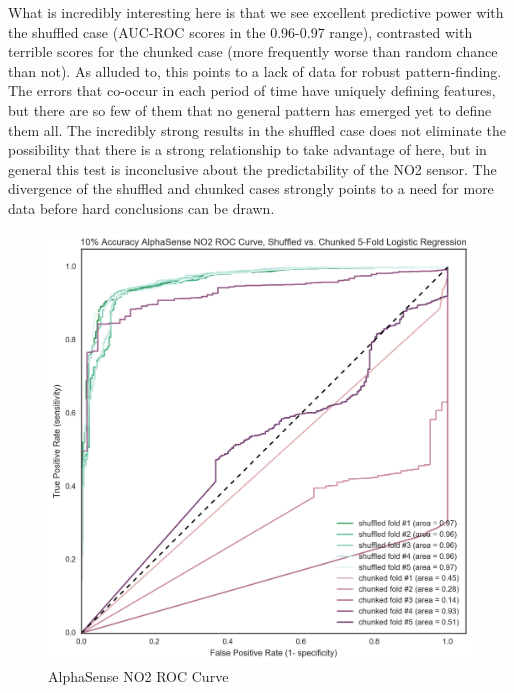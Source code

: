 \begin{margintable}
\centering
\offinterlineskip
\hspace*{-5cm}\raisebox{-4cm}[0pt][0pt]{}\par
\hspace{.3cm}\par
\vspace{-.5cm}
\hspace*{1cm}\par
{}
\vspace{-.35cm}\raisebox{-1cm}
}
\label{tab:as_no2_confusion}
\caption{Average AlphaSense NO2 Confusion Matrix w/Shuffled K-Fold}
\end{margintable}

What is incredibly interesting here is that we see excellent predictive power with the shuffled case (AUC-ROC scores in the 0.96-0.97 range), contrasted with terrible scores for the chunked case (more frequently worse than random chance than not).  As alluded to, this points to a lack of data for robust pattern-finding.  The errors that co-occur in each period of time have uniquely defining features, but there are so few of them that no general pattern has emerged yet to define them all.  The incredibly strong results in the shuffled case does not eliminate the possibility that there is a strong relationship to take advantage of here, but in general this test is inconclusive about the predictability of the NO2 sensor.  The divergence of the shuffled and chunked cases strongly points to a need for more data before hard conclusions can be drawn.


\begin{figure}[htb]
 	\includegraphics[width=\textwidth]{figs/as_no2_10_roc}               
 	 \caption{AlphaSense NO2 ROC Curve}
  	\label{fig:as_no2_10_roc}
\end{figure}



